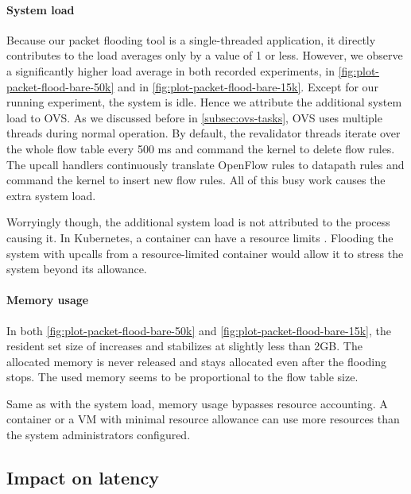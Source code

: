 \paragraph{System load}
Because our packet flooding tool is a single-threaded application, it directly contributes to the load averages only by a value of 1 or less. However, we observe a significantly higher load average in both recorded experiments, in \cref{fig:plot-packet-flood-bare-50k} and in \cref{fig:plot-packet-flood-bare-15k}. Except for our running experiment, the system is idle. Hence we attribute the additional system load to OVS. As we discussed before in \cref{subsec:ovs-tasks}, OVS uses multiple threads during normal operation. By default, the revalidator threads iterate over the whole flow table every 500 \si{\milli\second} and command the kernel to delete flow rules. The upcall handlers continuously translate OpenFlow rules to datapath rules and command the kernel to insert new flow rules. All of this busy work causes the extra system load.

Worryingly though, the additional system load is not attributed to the process causing it. In Kubernetes, a container can have a resource limits \cite{KubernetesResourceManagement}. Flooding the system with upcalls from a resource-limited container would allow it to stress the system beyond its allowance. 

\paragraph{Memory usage}
\label{par:memory-usage}
In both \cref{fig:plot-packet-flood-bare-50k} and \cref{fig:plot-packet-flood-bare-15k}, the resident set size of  increases and stabilizes at slightly less than 2GB. The allocated memory is never released and stays allocated even after the flooding stops. The used memory seems to be proportional to the flow table size.

Same as with the system load, memory usage bypasses resource accounting. A container or a VM with minimal resource allowance can use more resources than the system administrators configured.

\subsection{Impact on latency}


